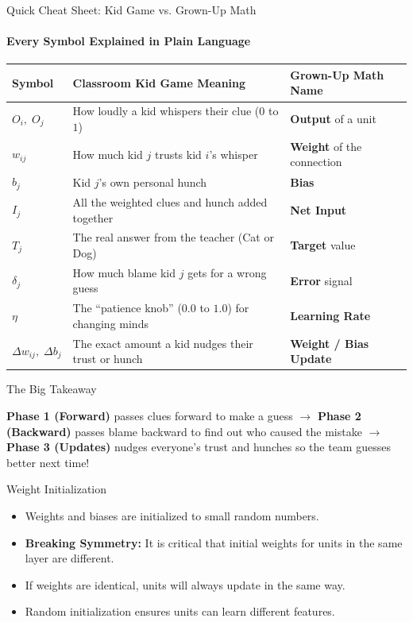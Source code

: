\documentclass[aspectratio=169]{beamer}
\begin{document}
\begin{frame}{Quick Cheat Sheet: Kid Game vs. Grown-Up Math}
    \framesubtitle{Every Symbol Explained in Plain Language}

    \begin{table}
    \footnotesize
    \centering
    \renewcommand{\arraystretch}{1}
    \begin{tabular}{lll}
    \toprule
    \textbf{Symbol} & \textbf{Classroom Kid Game Meaning} & \textbf{Grown-Up Math Name} \\
    \midrule
    $O_i, \; O_j$ & How loudly a kid whispers their clue ($0$ to $1$) & \textbf{Output} of a unit \\
    $w_{ij}$ & How much kid $j$ trusts kid $i$'s whisper & \textbf{Weight} of the connection \\
    $b_j$ & Kid $j$'s own personal hunch & \textbf{Bias} \\
    $I_j$ & All the weighted clues and hunch added together & \textbf{Net Input} \\
    $T_j$ & The real answer from the teacher (Cat or Dog) & \textbf{Target} value \\
    $\delta_j$ & How much blame kid $j$ gets for a wrong guess & \textbf{Error} signal \\
    $\eta$ & The ``patience knob'' ($0.0$ to $1.0$) for changing minds & \textbf{Learning Rate} \\
    $\Delta w_{ij}, \; \Delta b_j$ & The exact amount a kid nudges their trust or hunch & \textbf{Weight / Bias Update} \\
    \bottomrule
    \end{tabular}
    \end{table}

    \begin{exampleblock}{The Big Takeaway}
        \scriptsize

        \textbf{Phase 1 (Forward)} passes clues forward to make a guess $\rightarrow$ \textbf{Phase 2 (Backward)} passes blame backward to find out who caused the mistake $\rightarrow$ \textbf{Phase 3 (Updates)} nudges everyone's trust and hunches so the team guesses better next time!
    \end{exampleblock}
\end{frame}


\begin{frame}{Weight Initialization}
    \begin{itemize}
        \item Weights and biases are initialized to small random numbers.
        \item \textbf{Breaking Symmetry:} It is critical that initial weights for units in the same layer are different.
        \item If weights are identical, units will always update in the same way.
        \item Random initialization ensures units can learn different features.
    \end{itemize}
\end{frame}
\end{document}
